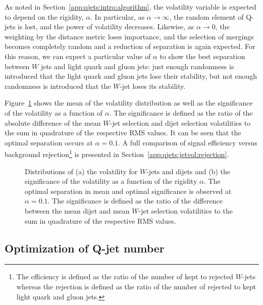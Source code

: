 As noted in Section~\ref{app:qjets:intro:algorithm}, the volatility variable is expected to depend on the rigidity, $\alpha$. In particular, as $\alpha\rightarrow\infty$, the random element of Q-jets is lost, and the power of volatility decreases. Likewise, as $\alpha\rightarrow 0$, the weighting by the distance metric loses importance, and the selection of mergings becomes completely random and a reduction of separation is again expected. For this reason, we can expect a particular value of $\alpha$ to show the best separation between $W$ jets and light quark and gluon jets: just enough randomness is introduced that the light quark and gluon jets lose their stability, but not enough randomness is introduced that the $W$-jet loses its stability.

Figure~\ref{fig:Vol_vs_alpha} shows the mean of the volatility distribution as well as the significance of the volatility as a function of $\alpha$. The significance is defined as the ratio of the absolute difference of the mean $W$-jet selection and dijet selection volatilities to the sum in quadrature of the respective RMS values. It can be seen that the optimal separation occurs at $\alpha = 0.1$. A full comparison of signal efficiency versus background rejection\footnote{The efficiency is defined as the ratio of the number of kept to rejected $W$-jets whereas the rejection is defined as the ratio of the number of rejected to kept light quark and gluon jets.} is presented in Section~\ref{app:qjets:jetvol:rejection}.

\begin{figure}[htbp]
\centering
{}
\caption{Distributions of (a) the volatility for $W$-jets and dijets and (b) the significance of the volatility  as a function of the rigidity $\alpha$. The optimal separation in mean and optimal significance is observed at $\alpha = 0.1$. The significance is defined as the ratio of the difference between the mean dijet and mean $W$-jet selection volatilities to the sum in quadrature of the respective RMS values.}
\label{fig:Vol_vs_alpha}
\end{figure}

\subsection{Optimization of Q-jet number}
\label{app:qjets:jetvol:number}

